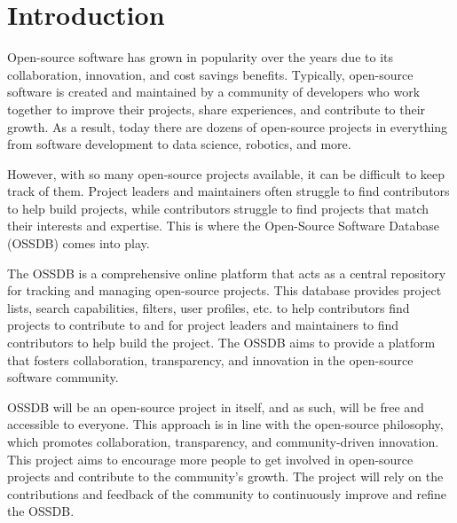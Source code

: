 \pagebreak
\section{Introduction}
Open-source software has grown in popularity over the years due to its collaboration, innovation, and cost savings benefits.
Typically, open-source software is created and maintained by a community of developers who work together to improve their projects, share experiences, and contribute to their growth.
As a result, today there are dozens of open-source projects in everything from software development to data science, robotics, and more.

However, with so many open-source projects available, it can be difficult to keep track of them.
Project leaders and maintainers often struggle to find contributors to help build projects, while contributors struggle to find projects that match their interests and expertise.
This is where the Open-Source Software Database (OSSDB) comes into play.

The OSSDB is a comprehensive online platform that acts as a central repository for tracking and managing open-source projects.
This database provides project lists, search capabilities, filters, user profiles, etc. to help contributors find projects to contribute
to and for project leaders and maintainers to find contributors to help build the project.
The OSSDB aims to provide a platform that fosters collaboration, transparency,
and innovation in the open-source software community.

OSSDB will be an open-source project in itself, and as such, will be free and accessible to everyone.
This approach is in line with the open-source philosophy, which promotes collaboration, transparency, and community-driven innovation.
This project aims to encourage more people to get involved in open-source projects and contribute to the community's growth.
The project will rely on the contributions and feedback of the community to continuously improve and refine the OSSDB.

